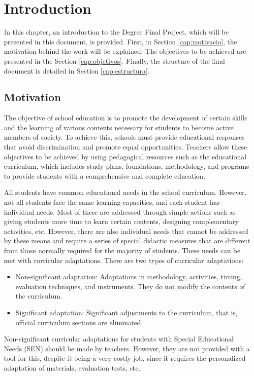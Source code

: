 \chapter{Introduction}
\label{cap:introduction}

In this chapter, an introduction to the Degree Final Project, which will be presented in this document, is provided. First, in Section \ref{cap:motivacio}, the motivation behind the work will be explained. The objectives to be achieved are presented in the Section \ref{cap:objetivos}. Finally, the structure of the final document is detailed in Section \ref{cap:estructura}.


\section{Motivation}\label{cap:motivation}
The objective of school education is to promote the development of certain skills and the learning of various contents necessary for students to become active members of society. To achieve this, schools must provide educational responses that avoid discrimination and promote equal opportunities. Teachers allow these objectives to be achieved by using pedagogical resources such as the educational curriculum, which includes study plans, foundations, methodology, and programs to provide students with a comprehensive and complete education.

All students have common educational needs in the school curriculum. However, not all students face the same learning capacities, and each student has individual needs. Most of these are addressed through simple actions such as giving students more time to learn certain contents, designing complementary activities, etc. However, there are also individual needs that cannot be addressed by these means and require a series of special didactic measures that are different from those normally required for the majority of students. These needs can be met with curricular adaptations. There are two types of curricular adaptations:
\begin{itemize}
    \item Non-significant adaptation: Adaptations in methodology, activities, timing, evaluation techniques, and instruments. They do not modify the contents of the curriculum.
    \item Significant adaptation: Significant adjustments to the curriculum, that is, official curriculum sections are eliminated.
\end{itemize}
Non-significant curricular adaptations for students with Special Educational Needs (SEN) should be made by teachers. However, they are not provided with a tool for this, despite it being a very costly job, since it requires the personalized adaptation of materials, evaluation tests, etc.

